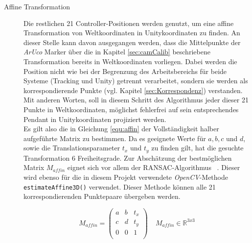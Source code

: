 \begin{description}
\item[Affine Transformation] Die restlichen 21 Controller-Positionen werden genutzt, um eine affine Transformation von Weltkoordinaten in Unitykoordinaten zu finden. An dieser Stelle kann davon ausgegangen werden, dass die Mittelpunkte der \textit{ArUco} Marker über die in Kapitel \ref{sec:camCalib} beschriebene Transformation bereits in Weltkoordinaten vorliegen. Dabei werden die Position nicht wie bei der Begrenzung des Arbeitsbereichs für beide Systeme (Tracking und Unity) getrennt verarbeitet, sondern sie werden als korrespondierende Punkte (vgl. Kapitel \ref{sec:Korrespondenz}) verstanden. Mit anderen Worten, soll in diesem Schritt des Algorithmus jeder dieser 21 Punkte in Weltkoordinaten, möglichst fehlerfrei auf sein entsprechendes Pendant in Unitykoordinaten projiziert werden. \\
Es gilt also die in Gleichung \ref{equ:affin} der Vollständigkeit halber aufgeführte Matrix zu bestimmen. Da es geeignete Werte für $a, b, c$ und $d$, sowie die Translationsparameter $t_x$ und $t_y$ zu finden gilt, hat die gesuchte Transformation 6 Freiheitsgrade. Zur Abschätzung der bestmöglichen Matrix $M_{affin}$ eignet sich vor allem der RANSAC-Algorithmus ~\cite{articel:RANSAC}. Dieser wird ebenso für die in diesem Projekt verwendete \textit{OpenCV}-Methode \texttt{estimateAffine3D()} verwendet. Dieser Methode können alle 21 korrespondierenden Punktepaare übergeben werden. 

\begin{equation}
\label{equ:affin}
M_{affin} = 
\begin{pmatrix}
a & b & t_x \\
c & d & t_y \\
0 & 0 & 1  \\
\end{pmatrix} 
~ ~ ~ ~ ~M_{affin} \in \mathbb{R}^{3x3}
\end{equation}
\end{description}

